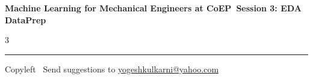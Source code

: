 \documentclass[8pt,landscape]{article}
\begin{document}
\footnotesize

\begin{center}
\Large{\textbf{Machine Learning for Mechanical Engineers at CoEP\ Session 3: EDA DataPrep}}
\end{center}

\begin{multicols}{3}

\end{multicols}

\rule{\linewidth}{0.25pt}
\scriptsize
Copyleft \textcopyleft\  Send suggestions to
\href{http://www.yogeshkulkarni.com}{yogeshkulkarni@yahoo.com}
\end{document}
